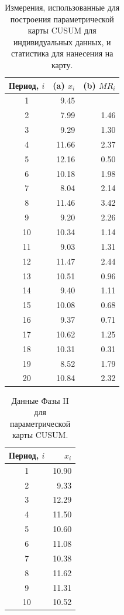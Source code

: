 \begin{table}[htbp]
	\centering
	\caption{Измерения, использованные для построения параметрической карты CUSUM для индивидуальных данных, и статистика для нанесения на карту.}
	\label{tab:3.16}
	\begin{tabular}{crr}
		\toprule
		Период, \(i\) & (a) \(x_i\) & (b) \(MR_i\) \\
		\midrule
		1  & 9.45  &       \\
		2  & 7.99  & 1.46  \\
		3  & 9.29  & 1.30  \\
		4  & 11.66 & 2.37  \\
		5  & 12.16 & 0.50  \\
		6  & 10.18 & 1.98  \\
		7  & 8.04  & 2.14  \\
		8  & 11.46 & 3.42  \\
		9  & 9.20  & 2.26  \\
		10 & 10.34 & 1.14  \\
		11 & 9.03  & 1.31  \\
		12 & 11.47 & 2.44  \\
		13 & 10.51 & 0.96  \\
		14 & 9.40  & 1.11  \\
		15 & 10.08 & 0.68  \\
		16 & 9.37  & 0.71  \\
		17 & 10.62 & 1.25  \\
		18 & 10.31 & 0.31  \\
		19 & 8.52  & 1.79  \\
		20 & 10.84 & 2.32  \\
		\bottomrule
	\end{tabular}
\end{table}

\begin{table}[htbp]
	\centering
	\caption{Данные Фазы II для параметрической карты CUSUM.}
	\label{tab:3.17}
	\begin{tabular}{cr}
		\toprule
		Период, \(i\) & \(x_i\) \\
		\midrule
		1  & 10.90 \\
		2  & 9.33  \\
		3  & 12.29 \\
		4  & 11.50 \\
		5  & 10.60 \\
		6  & 11.08 \\
		7  & 10.38 \\
		8  & 11.62 \\
		9  & 11.31 \\
		10 & 10.52 \\
		\bottomrule
	\end{tabular}
\end{table}

